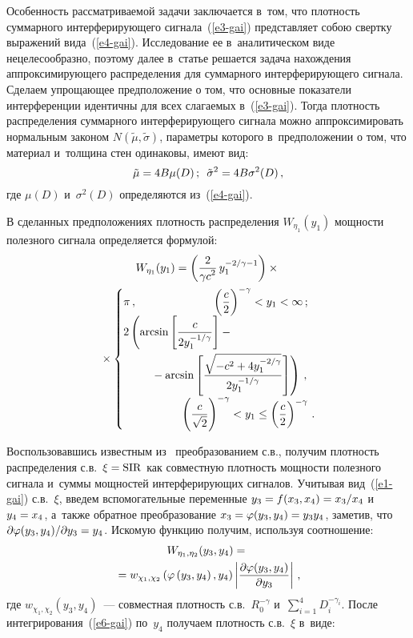\begin{multicols}{2}
  Особенность рассматриваемой задачи заключается в~том, что плотность 
суммарного интерферирующего сигнала~(\ref{e3-gai}) представляет собою 
свертку выражений вида~(\ref{e4-gai}). Исследование ее в~аналитическом 
виде нецелесообразно, поэтому далее в~статье решается задача нахождения 
аппроксимирующего распределения для суммарного интерфери\-ру\-юще\-го 
сигнала. Сделаем упрощающее предположение о том, что основные 
показатели интерференции идентичны для всех слагаемых в~(\ref{e3-gai}). 
Тогда плотность распределения суммарного интерфе\-ри\-ру\-юще\-го сигнала 
можно аппроксимировать нормальным законом  
$N(\tilde{\mu},\tilde{\sigma})$, параметры которого в~предположении о том, 
что материал и~толщина стен одинаковы, имеют вид:  
$$
\tilde{\mu}= 
4B\mu(D)\,;\enskip  \tilde{\sigma}^2= 4B\sigma^2(D)\,,
$$
 где $\mu(D)$  и~$\sigma^2(D)$ определяются из~(\ref{e4-gai}). 
  
  В сделанных предположениях плотность распределения $W_{\eta_1}(y_1)$ 
мощности полезного сигнала определяется формулой:
  \begin{multline}
  W_{\eta_1}(y_1)= \left( \fr{2}{\gamma c^2}\,y_1^{-2/\gamma-1}\right)\times{}\\
  {}\times
  \begin{cases}
  \pi\,, &\hspace*{-10mm} \left(\fr{c}{2}\right)^{-\gamma}<y_1<\infty\,;\\[3pt]
  2\left( \arcsin \left[ \fr{c}{2y_1^{-1/\gamma}}\right] -{}\right. & \\[12pt]
  &\left.\hspace*{-30mm}{}-\arcsin\left[ \fr{\sqrt{-c^2 
+ 4y_1^{-2/\gamma}}} {2y_1^{-1/\gamma}} \right] \right)\,,\\[3pt]
&\hspace*{-20mm} \left( \fr{c} 
{\sqrt{2}}\right)^{-\gamma} <y_1\leq \left( \fr{c}{2}\right)^{-\gamma}\,.
  \end{cases}
  \label{e5-gai}
  \end{multline}
  
  Воспользовавшись известным из~\cite{15-gai} преобразованием 
с.в., получим плотность распределения с.в.\ $\xi\hm= \mathrm{SIR}$ как 
совместную плотность мощности полезного сигнала и~суммы мощностей 
интерферирующих сигналов. Учитывая вид~(\ref{e1-gai}) с.в.~$\xi$, введем 
вспомогательные переменные $y_3\hm= f(x_3, x_4)\hm= x_3/x_4$ 
и~$y_4\hm= x_4$, а~также обратное преобразование $x_3\hm= 
\varphi(y_3,y_4)\hm= y_3y_4$, заметив, что $\partial \varphi(y_3,y_4)/\partial 
y_3\hm= y_4$. Искомую функцию получим, используя соотношение: 
  \begin{multline}
  W_{\eta_1,\eta_2}(y_3,y_4) ={}\\
  {}=w_{\chi_1,\chi_2} \left( \varphi\left(y_3, 
y_4\right),y_4\right) \left\vert \displaystyle\frac{\displaystyle \partial \varphi(y_3,y_4)\mathstrut}{\displaystyle \partial 
y_3\mathstrut}\right\vert\,,
  \label{e6-gai}
\end{multline}
где $w_{\chi_1,\chi_2}(y_3,y_4)$~--- совместная плотность  
с.в.~$R_0^{-\gamma}$ и~$\sum\nolimits_{i=1}^4 D_i^{-\gamma_i}$. После 
интегрирования~(\ref{e6-gai}) по~$y_4$ получаем плотность с.в.~$\xi$ 
в~виде: 


\end{multicols}
